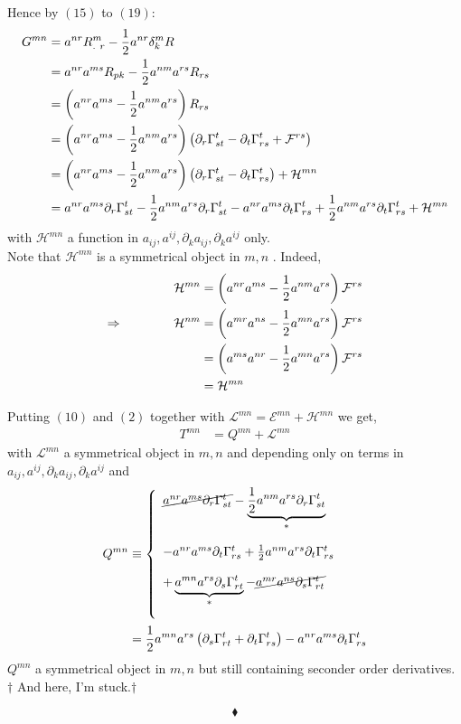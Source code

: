 Hence by $(15)$ to $(19)$:
\begin{align}
G^{mn} &= a^{nr} R^m_{. \ r}-\frac{1}{2} a^{nr}\delta^m_k R \\
&=  a^{nr} a^{ms} R_{pk}-\frac{1}{2} a^{nm}a^{rs}R_{rs} \\
&=  \left( a^{nr} a^{ms} -\frac{1}{2} a^{nm}a^{rs}\right)R_{rs} \\
&=  \left( a^{nr} a^{ms} -\frac{1}{2} a^{nm}a^{rs}\right)\left(\partial_r \Gamma^t_{st} - \partial_t \Gamma^t_{rs} + \mathcal{F}^{rs}\right) \\
&=  \left( a^{nr} a^{ms} -\frac{1}{2} a^{nm}a^{rs}\right)\left(\partial_r \Gamma^t_{st} - \partial_t \Gamma^t_{rs} \right)+ \mathcal{H}^{mn}\\
&= a^{nr} a^{ms}\partial_r \Gamma^t_{st} -\frac{1}{2} a^{nm}a^{rs}\partial_r \Gamma^t_{st} -  a^{nr} a^{ms}\partial_t \Gamma^t_{rs} +\frac{1}{2} a^{nm}a^{rs}\partial_t \Gamma^t_{rs}+ \mathcal{H}^{mn}
\end{align}
with $\mathcal{H}^{mn}$ a function in  $a_{ij}, a^{ij}, \partial_k a_{ij}, \partial_k a^{ij}$ only.\\
Note that $\mathcal{H}^{mn}$ is a symmetrical object in $m,n$ . Indeed,
\begin{align}
\mathcal{H}^{mn} &= \left( a^{nr} a^{ms} -\frac{1}{2} a^{nm}a^{rs}\right)\mathcal{F}^{rs}\\
\Rightarrow\quad\quad\quad\quad \mathcal{H}^{nm} &= \left( a^{mr} a^{ns} -\frac{1}{2} a^{mn}a^{rs}\right)\mathcal{F}^{rs}\\
&= \left( a^{ms} a^{nr} -\frac{1}{2} a^{mn}a^{rs}\right)\mathcal{F}^{rs}\\
&= \mathcal{H}^{mn}
\end{align}
 
Putting  $(10)$ and $(2)$ together with $\mathcal{L}^{mn}=\mathcal{E}^{mn}+ \mathcal{H}^{mn}$ we get,
\begin{align}
T^{mn} &= Q^{mn}+\mathcal{L}^{mn}
\end{align}
with $\mathcal{L}^{mn}$ a symmetrical object in $m,n$ and depending only on terms in $a_{ij}, a^{ij}, \partial_k a_{ij}, \partial_k a^{ij}$  and  
\begin{align}
 Q^{mn} &\equiv \left\{ \begin{array}{l}
\cancel{a^{nr} a^{ms}\partial_r \Gamma^t_{st}} -\underbrace{\frac{1}{2} a^{nm}a^{rs}\partial_r \Gamma^t_{st}}_{*} \\\\ 
-  a^{nr} a^{ms}\partial_t \Gamma^t_{rs} +\frac{1}{2} a^{nm}a^{rs}\partial_t \Gamma^t_{rs}\\\\
+ \underbrace{a^{mn}a^{rs}\partial_{s}\Gamma^t_{rt}}_{*}-\cancel{a^{mr}a^{ns}\partial_{s}\Gamma^t_{rt}}\\\\
\end{array} \right. \\
&= \frac{1}{2} a^{mn}a^{rs}\left(\partial_{s}\Gamma^t_{rt}+\partial_t \Gamma^t_{rs}\right)-  a^{nr} a^{ms}\partial_t \Gamma^t_{rs}
\end{align}
$Q^{mn} $ a symmetrical object in $m,n$ but still containing seconder order derivatives.\\
$\dagger$ And here, I'm stuck.$\dagger$

$$\blacklozenge$$
\newpage

